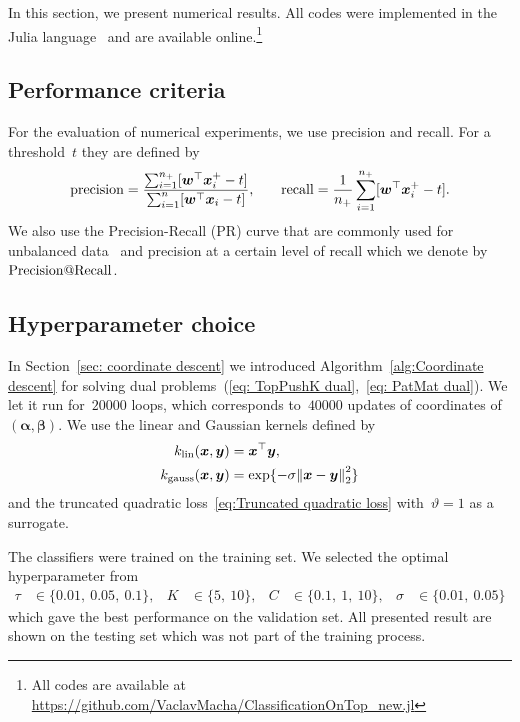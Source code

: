 In this section, we present numerical results. All codes were implemented in the Julia language~\cite{bezanson2017julia} and are available online.\footnote{All codes are available at \url{https://github.com/VaclavMacha/ClassificationOnTop_new.jl}}

\subsection{Performance criteria}

For the evaluation of numerical experiments, we use precision and recall. For a threshold~$t$ they are defined by
\begin{equation}\label{eq:prec_rec}
  \begin{alignedat}{2}
      \operatorname{precision}
      & = \frac{\sum_{i = 1}^{n_{+}} [\bm{w}^{\top}\bm{x}^+_{i} - t]}{\sum_{i = 1}^{n} [\bm{w}^{\top}\bm{x}_{i} - t]}, & \qquad
      \operatorname{recall}
      & = \frac{1}{n_{+}} \sum_{i = 1}^{n_{+}} [\bm{w}^{\top}\bm{x}^+_{i} - t].
  \end{alignedat}
\end{equation}
We also use the Precision-Recall (PR) curve that are commonly used for unbalanced data~\cite{davis2006relationship} and precision at a certain level of recall which we denote by~$\operatorname{Precision@Recall}$.

\subsection{Hyperparameter choice}

In Section~\ref{sec: coordinate descent} we introduced Algorithm~\ref{alg:Coordinate descent} for solving dual problems~(\ref{eq: TopPushK dual},~\ref{eq: PatMat dual}). We let it run for~$20000$ \repeatloop loops, which corresponds to~$40000$ updates of coordinates of~$(\bm{\alpha},\bm{\beta})$. We use the linear and Gaussian kernels defined by
\begin{align}
  k_{\textrm{lin}}(\bm{x}, \bm{y})   & = \bm{x}^{\top} \bm{y}, \label{eq:Linear kernel} \\
  k_{\textrm{gauss}}(\bm{x}, \bm{y}) & = \exp\{-\sigma \norm{\bm{x} - \bm{y}}_2^2\} \label{eq:Gaussian kernel}
\end{align}
and the truncated quadratic loss~\eqref{eq:Truncated quadratic loss} with~$\vartheta = 1$ as a surrogate. 

The classifiers were trained on the training set. We selected the optimal hyperparameter from
\begin{equation*}
  \begin{aligned}
    \tau   & \in \{0.01,\ 0.05,\ 0.1\}, &
    K      & \in \{5,\ 10\}, &
    C      & \in \{0.1,\ 1,\ 10\}, &
    \sigma & \in \{0.01,\ 0.05\} 
  \end{aligned}
\end{equation*}
which gave the best performance on the validation set. All presented result are shown on the testing set which was not part of the training process.

